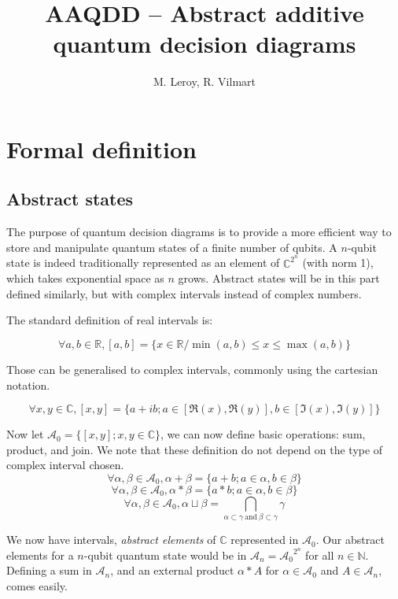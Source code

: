 \documentclass{article}
\title{AAQDD -- Abstract additive quantum decision diagrams}
\author{M. Leroy, R. Vilmart}
\begin{document}
\maketitle

\section{Formal definition}

\subsection{Abstract states}

The purpose of quantum decision diagrams is to provide a more efficient way to store and manipulate quantum states of a finite number of qubits. A $n$-qubit state is indeed traditionally represented as an element of $\mathbb{C}^{2^n}$ (with norm 1), which takes exponential space as $n$ grows. Abstract states will be in this part defined similarly, but with complex intervals instead of complex numbers.

The standard definition of real intervals is:

$$\forall a, b \in \mathbb{R}, [a, b]
= \{x \in \mathbb{R} / \min(a, b) \le x \le \max(a, b)\}$$

Those can be generalised to complex intervals, commonly using the cartesian notation.

$$\forall x, y \in \mathbb{C}, [x, y]
= \{a + ib ; a \in [\Re(x), \Re(y)], b \in [\Im(x), \Im(y)]\}$$

Now let $\mathcal{A}_0 = \{[x, y] ; x, y \in \mathbb{C}\}$, we can now define basic operations: sum, product, and join. We note that these definition do not depend on the type of complex interval chosen.
$$\forall \alpha, \beta \in \mathcal{A}_0, \alpha + \beta = \{a + b ; a \in \alpha, b \in \beta\}$$
$$\forall \alpha, \beta \in \mathcal{A}_0, \alpha * \beta = \{a * b ; a \in \alpha, b \in \beta\}$$
$$\forall \alpha, \beta \in \mathcal{A}_0, \alpha \sqcup \beta = \bigcap_{\alpha \subset \gamma~\text{and}~\beta \subset \gamma} \gamma$$

We now have intervals, \textit{abstract elements} of $\mathbb{C}$ represented in $\mathcal{A}_0$. Our abstract elements for a $n$-qubit quantum state would be in $\mathcal{A}_n = {\mathcal{A}_0}^{2^n}$ for all $n \in \mathbb{N}$. Defining a sum in $\mathcal{A}_n$, and an external product $\alpha * A$ for
$\alpha \in \mathcal{A}_0$ and $A \in \mathcal{A}_n$, comes easily.
\end{document}
